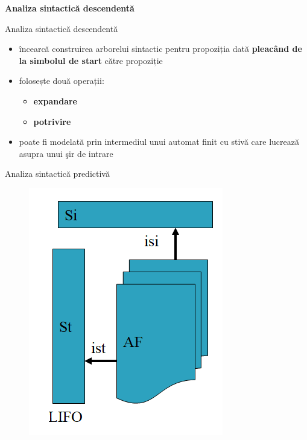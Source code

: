 \documentclass[pdf]{beamer}
\begin{document}
\begin{frame}
\begin{center}
\textbf{Analiza sintactică descendentă}
\end{center}
\end{frame}



\begin{frame}{Analiza sintactică descendentă}
\begin{itemize}
\item 
încearcă construirea arborelui sintactic pentru propoziția dată \textbf{pleacând de la simbolul de start} către propoziție

\item 
folosește două operații:

   \begin{itemize}
     \item 
     \textbf{expandare}
     \item
     \textbf{potrivire}
   \end{itemize}

\item
poate fi modelată prin intermediul unui automat finit cu stivă care lucrează asupra unui şir de intrare
\end{itemize}
\end{frame}



\begin{frame}{ Analiza sintactică predictivă}
\begin{figure}
\centering
\includegraphics[scale=0.75]{img/afs}
\end{figure}

\end{frame}
\end{document}
